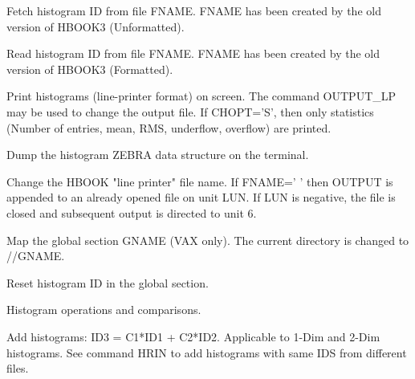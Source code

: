 \BEGARG
{}
\ENDARG
\BEGTEXT
Fetch histogram ID from file FNAME.
FNAME has been created by the old version of HBOOK3 (Unformatted).
\ENDTEXT

\BEGARG
{}
\ENDARG
\BEGTEXT
Read histogram ID from file FNAME.
FNAME has been created by the old version of HBOOK3 (Formatted).
\ENDTEXT

\BEGARG
{}
\ENDARG
\BEGTEXT
Print histograms (line-printer format) on screen.
The command OUTPUT\_LP may be used to change the output file.
If CHOPT='S', then only statistics (Number of entries, mean, RMS,
underflow, overflow) are printed.
\ENDTEXT

\BEGARG
{}
\ENDARG
\BEGTEXT
Dump the histogram ZEBRA data structure on the terminal.
\ENDTEXT

\BEGARG
{}
\ENDARG
\BEGTEXT
Change the HBOOK "line printer" file name.
If FNAME=' ' then OUTPUT is appended to an already opened file on unit LUN.
If LUN is negative, the file is closed and subsequent output
is directed to unit 6.
\ENDTEXT

\BEGARG
{}
\ENDARG
\BEGTEXT
Map the global section GNAME (VAX only).
The current directory is changed to //GNAME.
\ENDTEXT

\BEGARG
{}
\ENDARG
\BEGTEXT
Reset histogram ID in the global section.
\ENDTEXT


\BEGTEXT
Histogram operations and comparisons.
\ENDTEXT

\BEGARG
{}
\ENDARG
\BEGTEXT
Add histograms: ID3 = C1*ID1 + C2*ID2.
Applicable to 1-Dim and 2-Dim histograms.
See command HRIN to add histograms with same IDS
from different files.
\ENDTEXT

